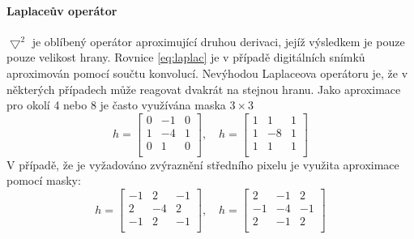 \paragraph{Laplaceův operátor}
$\bigtriangledown ^2$ je oblíbený operátor aproximující druhou derivaci, jejíž výsledkem je pouze pouze velikost hrany. Rovnice \ref{eq:laplac} je v případě digitálních snímků aproximován pomocí součtu konvolucí. Nevýhodou Laplaceova operátoru je, že v některých případech může reagovat dvakrát na stejnou hranu. Jako aproximace pro okolí 4 nebo 8 je často využívána maska $3\times 3$ \cite[str.~136]{Image-Processing-Analysis-and-Machine-Vision}
\begin{equation}
h=
\begin{bmatrix}
 0 & -1 &  0\\
 1 & -4 &  1\\ 
 0 &  1 &  0\\ 
\end{bmatrix},  \quad
h=
\begin{bmatrix}
 1 &  1 &  1\\
 1 & -8 &  1\\ 
 1 &  1 &  1\\ 
\end{bmatrix}
\end{equation}
V případě, že je vyžadováno zvýraznění středního pixelu je využita aproximace pomocí masky:
\begin{equation}
h=
\begin{bmatrix}
-1 &  2 & -1\\
 2 & -4 &  2\\ 
-1 &  2 & -1\\ 
\end{bmatrix},  \quad
h=
\begin{bmatrix}
 2 & -1 &  2\\
-1 & -4 & -1\\ 
 2 & -1 &  2\\ 
\end{bmatrix}
\end{equation}

